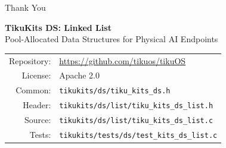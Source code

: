 \documentclass[aspectratio=169, 10pt]{beamer}
\begin{document}
\begin{frame}{Thank You}
\begin{center}
\Large\textbf{TikuKits DS: Linked List}\\[0.5em]
\normalsize Pool-Allocated Data Structures for Physical AI Endpoints\\[1.5em]

\begin{tabular}{rl}
  Repository: & \url{https://github.com/tikuos/tikuOS} \\
  License:    & Apache 2.0 \\
  Common:     & \texttt{tikukits/ds/tiku\_kits\_ds.h} \\
  Header:     & \texttt{tikukits/ds/list/tiku\_kits\_ds\_list.h} \\
  Source:     & \texttt{tikukits/ds/list/tiku\_kits\_ds\_list.c} \\
  Tests:      & \texttt{tikukits/tests/ds/test\_kits\_ds\_list.c} \\
\end{tabular}
\end{center}
\end{frame}
\end{document}
